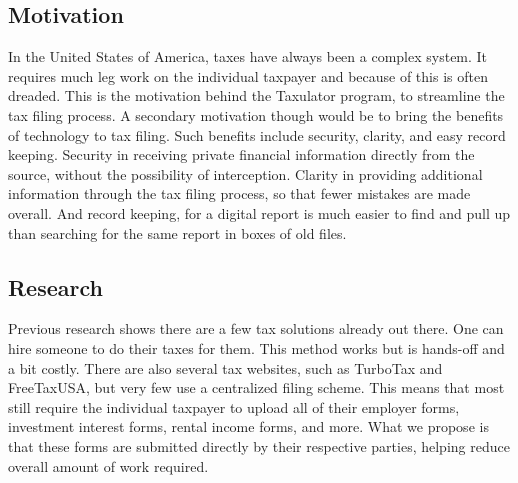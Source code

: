 \documentclass[sigconf]{acmart}
\begin{document}
\subsection{Motivation}
In the United States of America, taxes have always been a complex system. It requires much leg work on the individual taxpayer and because of this is often dreaded. This is the motivation behind the Taxulator program, to streamline the tax filing process.
A secondary motivation though would be to bring the benefits of technology to tax filing. Such benefits include security, clarity, and easy record keeping. Security in receiving private financial information directly from the source, without the possibility of interception. Clarity in providing additional information through the tax filing process, so that fewer mistakes are made overall. And record keeping, for a digital report is much easier to find and pull up than searching for the same report in boxes of old files.
\subsection{Research}
Previous research shows there are a few tax solutions already out there. One can hire someone to do their taxes for them. This method works but is hands-off and a bit costly. There are also several tax websites, such as TurboTax and FreeTaxUSA, but very few use a centralized filing scheme. This means that most still require the individual taxpayer to upload all of their employer forms, investment interest forms, rental income forms, and more. What we propose is that these forms are submitted directly by their respective parties, helping reduce overall amount of work required.
\end{document}
